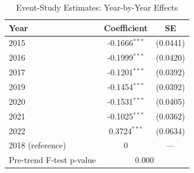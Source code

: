 \begin{table}[t]
\centering
\caption{Event-Study Estimates: Year-by-Year Effects}
\label{tab:eventstudy}
\begin{tabular}{lcc}
\toprule
Year & Coefficient & SE \\
\midrule
2015 & -0.1666$^{***}$ & (0.0441) \\
2016 & -0.1999$^{***}$ & (0.0420) \\
2017 & -0.1201$^{***}$ & (0.0392) \\
2019 & -0.1454$^{***}$ & (0.0392) \\
2020 & -0.1531$^{***}$ & (0.0405) \\
2021 & -0.1025$^{***}$ & (0.0362) \\
2022 & 0.3724$^{***}$ & (0.0634) \\
\midrule
2018 (reference) & 0 & --- \\
\midrule
Pre-trend F-test p-value & \multicolumn{2}{c}{0.000} \\
\bottomrule
\end{tabular}
\par{}
\end{table}
